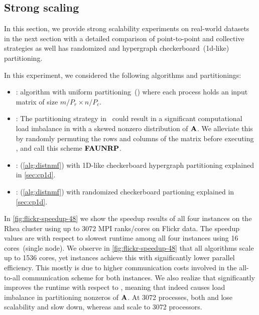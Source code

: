 \subsection {Strong scaling}
In this section, we provide strong scalability experiments on real-world datasets in the next section with a detailed comparison of point-to-point and collective strategies as well has randomized and hypergraph checkerboard~(1d-like) partitioning.

In this experiment, we considered the following algorithms and partitionings:
\begin{itemize}
	\item \unp: \mpifaun algorithm \cite{KBP16,KBP16MPIFAUN} with uniform partitioning~(\unp) where each process holds an input matrix of size $m/P_r \times n/P_c$. 
	\item \urp: The partitioning strategy in \unp\ could result in a significant computational load imbalance in with a skewed nonzero distribution of $\mathbf{A}$. We alleviate this by randomly permuting the rows and columns of the matrix before executing \mpifaun, and call this scheme $\textbf{FAUNRP}$.
	\item \cpp: \distspnmf (\cref{alg:distnmf}) with 1D-like checkerboard hypergraph partitioning explained in \cref{sec:cp1d}.
	\item \crp: \distspnmf (\cref{alg:distnmf}) with randomized checkerboard partioning explained in \cref{sec:cp1d}.
	
\end{itemize}

In \cref{fig:flickr-speedup-48} we show the speedup results of all four instances on the Rhea cluster using up 
to 3072 MPI ranks/cores on Flickr data.
The speedup values are with respect to slowest runtime among all four instances using 16 cores~(single node).
We observe in \cref{fig:flickr-speedup-48} that all algorithms scale up to 1536 cores, yet \mpifaun instances 
achieve this with significantly lower parallel efficiency.
This mostly is due to higher communication costs involved in the all-to-all communication scheme for both instances.
We also realize that \urp significantly improves the runtime with respect to \unp, meaning that \unp indeed causes load imbalance in partitioning nonzeros of $\mathbf{A}$.
At 3072 processes, both \urp and \unp lose scalability and slow down, whereas \cpp and \crp scale to 3072 processors.

